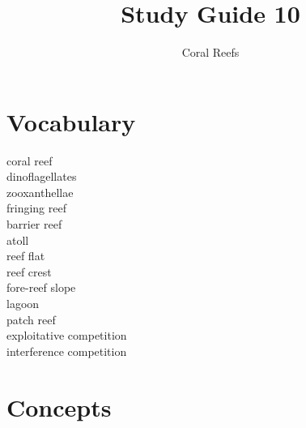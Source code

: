 \documentclass[nofonts, letterpaper]{tufte-handout}
\title{Study Guide 10}
\author{Coral Reefs}
\date{} %
\begin{document}
\maketitle	%


\section{Vocabulary}
\vspace{-1\baselineskip}
\begin{multicols}{2}
coral reef\\
dinoflagellates\\
zooxanthellae\\
fringing reef\\
barrier reef\\
atoll\\
reef flat\\
reef crest\\
fore-reef slope\\
lagoon\\
patch reef\\
exploitative competition\\
interference competition
\end{multicols}

\section{Concepts}
\end{document}
